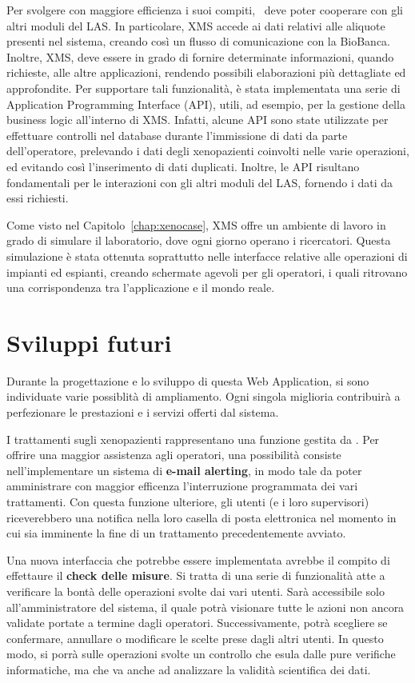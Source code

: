 Per svolgere con maggiore efficienza i suoi compiti, \Xeno\ deve poter cooperare con gli altri moduli del LAS. In particolare, XMS accede ai dati relativi alle aliquote presenti nel sistema, creando cos\`i un flusso di comunicazione con la BioBanca. Inoltre, XMS, deve essere in grado di fornire determinate informazioni, quando richieste, alle altre applicazioni, rendendo possibili elaborazioni pi\`u dettagliate ed approfondite. Per supportare tali funzionalit\`a, \`e stata implementata una serie di Application Programming Interface (API), utili, ad esempio, per la gestione della business logic all'interno di XMS. Infatti, alcune API sono state utilizzate per effettuare controlli nel database durante l'immissione di dati da parte dell'operatore, prelevando i dati degli xenopazienti coinvolti nelle varie operazioni, ed evitando cos\`i l'inserimento di dati duplicati. Inoltre, le API risultano fondamentali per le interazioni con gli altri moduli del LAS, fornendo i dati da essi richiesti. 

Come visto nel Capitolo~\ref{chap:xenocase}, XMS offre un ambiente di lavoro in grado di simulare il laboratorio, dove ogni giorno operano i ricercatori. Questa simulazione \`e stata ottenuta soprattutto nelle interfacce relative alle operazioni di impianti ed espianti, creando schermate agevoli per gli operatori, i quali ritrovano una corrispondenza tra l'applicazione e il mondo reale.

\section{Sviluppi futuri}

Durante la progettazione e lo sviluppo di questa Web Application, si sono individuate varie possiblit\`a di ampliamento. Ogni singola miglioria contribuir\`a a perfezionare le prestazioni e i servizi offerti dal sistema.

I trattamenti sugli xenopazienti rappresentano una funzione gestita da \Xeno. Per offrire una maggior assistenza agli operatori, una possibilit\`a consiste nell'implementare un sistema di \textbf{e-mail alerting}, in modo tale da poter amministrare con maggior efficenza l'interruzione programmata dei vari trattamenti. Con questa funzione ulteriore, gli utenti (e i loro supervisori) riceverebbero una notifica nella loro casella di posta elettronica nel momento in cui sia imminente la fine di un trattamento precedentemente avviato.

Una nuova interfaccia che potrebbe essere implementata avrebbe il compito di effettaure il \textbf{check delle misure}. Si tratta di una serie di funzionalit\`a atte a verificare la bont\`a delle operazioni svolte dai vari utenti. Sar\`a accessibile solo all'amministratore del sistema, il quale potr\`a visionare tutte le azioni non ancora validate portate a termine dagli operatori. Successivamente, potr\`a scegliere se confermare, annullare o modificare le scelte prese dagli altri utenti. In questo modo, si porr\`a sulle operazioni svolte un controllo che esula dalle pure verifiche informatiche, ma che va anche ad analizzare la validit\`a scientifica dei dati.

